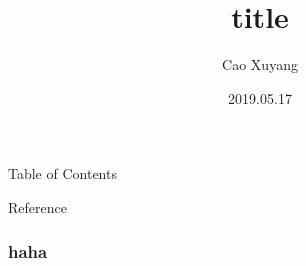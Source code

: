 \documentclass{beamer}
\title{title}
\author{Cao Xuyang}
\date{2019.05.17}
\begin{document}
\frame{\titlepage}                  %
\begin{frame}{Table of Contents}    %
    \setcounter{tocdepth}{1}        %
    \tableofcontents                %
\end{frame}



\begin{frame}{Reference}
    \frametitle{haha}
    
    
  
\end{frame}
\end{document}
